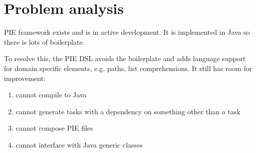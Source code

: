 \chapter{\label{chap:problem_analysis}Problem analysis}

PIE framework exists and is in active development.
It is implemented in Java so there is lots of boilerplate.

To resolve this, the PIE DSL avoids the boilerplate and adds language support for domain specific elements, e.g. paths, list comprehensions.
It still has room for improvement:
\begin{enumerate}
  \item cannot compile to Java
  \item cannot generate tasks with a dependency on something other than a task
  \item cannot compose PIE files
  \item cannot interface with Java generic classes
\end{enumerate}
